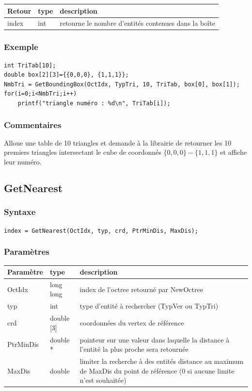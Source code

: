\documentclass[a4paper,12pt]{article}
\begin{document}
\begin{tabular}{|m{3cm}|m{2cm}|m{8.5cm}|}
\hline
Retour     & type   & description \\
\hline
index      & int    & retourne le nombre d'entités contenues dans la boîte \\
\hline
\end{tabular}

\subsubsection*{Exemple}

\begin{tt}
\begin{verbatim}
int TriTab[10];
double box[2][3]={{0,0,0}, {1,1,1}};
NmbTri = GetBoundingBox(OctIdx, TypTri, 10, TriTab, box[0], box[1]);
for(i=0;i<NmbTri;i++)
    printf("triangle numéro : %d\n", TriTab[i]);
\end{verbatim}
\end{tt}
\normalfont

\subsubsection*{Commentaires}
Alloue une table de 10 triangles et demande à la librairie de retourner les 10 premiers triangles intersectant le cube de coordonnés $\{0,0,0\} - \{1,1,1\}$ et affiche leur numéro.



\subsection{GetNearest}
\subsubsection*{Syntaxe}
{\tt index = GetNearest(OctIdx, typ, crd, PtrMinDis, MaxDis);}
\subsubsection*{Paramètres}

\begin{tabular}{|m{3cm}|m{2cm}|m{8.5cm}|}
\hline
Paramètre  & type       & description \\
\hline
OctIdx     & long long  & index de l'octree retourné par NewOctree \\
\hline
typ        & int        & type d'entité à rechercher (TypVer ou TypTri) \\
\hline
crd        & double [3] & coordonnées du vertex de référence \\
\hline
PtrMinDis  & double *   & pointeur sur une valeur dans laquelle la distance à l'entité la plus proche sera retournée \\
\hline
MaxDis     & double     & limiter la recherche à des entités distance au maximum de MaxDis du point de référence (0 si aucune limite n'est souhaitée) \\
\hline
\end{tabular}
\end{document}
